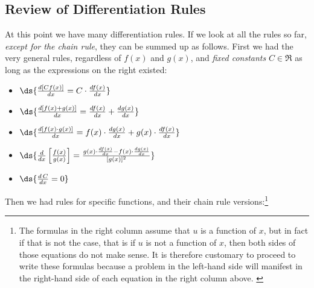 \subsection{Review of Differentiation Rules}
At this point we have many differentiation rules.
If we look at all the rules so far, {\it except for the
chain rule}, they can be summed up as follows.  First
we had the very general rules, regardless of $f(x)$
and $g(x)$, and {\it fixed constants} $C\in\Re$
 as long as the expressions on the right
existed:
\begin{multicols}{2}
\begin{itemize}
\item $\ds{\frac{d\left[Cf(x)\right]}{dx}=C\cdot\frac{df(x)}{dx}}$
\item $\ds{\frac{d[f(x)+g(x)]}{dx}=\frac{df(x)}{dx}+\frac{dg(x)}{dx}}$
\item $\ds{\frac{d[f(x)\cdot g(x)]}{dx}=f(x)\cdot\frac{dg(x)}{dx}
                             +g(x)\cdot\frac{df(x)}{dx}}$
\item $\ds{\frac{d}{dx}\left[\frac{f(x)}{g(x)}\right]
    =\frac{g(x)\cdot\frac{df(x)}{dx}-f(x)\cdot\frac{dg(x)}{dx}}{[g(x)]^2}}$
\item $\ds{\frac{d\,C}{dx}=0}$
\bigskip

\end{itemize}\end{multicols}
Then we had rules for specific functions, and their chain rule 
versions:\footnote{%
The formulas in the right column assume that $u$ is a function of $x$, 
but in fact if that is not the case,  that is if $u$ is not a function
of $x$, then both sides of those equations do not make sense.  It
is therefore customary to proceed to write these formulas
because a problem in the left-hand side will manifest 
in the right-hand side of each equation in the right column above.
\label{WhatIfUNotAFunctionOfX}}

